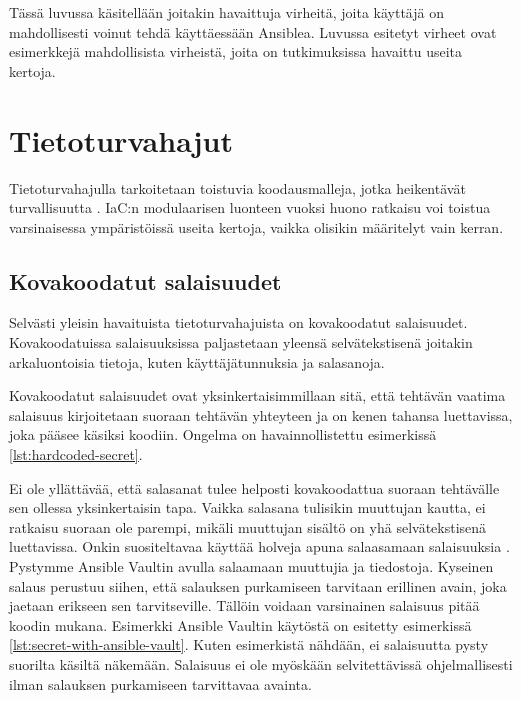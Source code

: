 Tässä luvussa käsitellään joitakin havaittuja virheitä, joita käyttäjä on mahdollisesti
voinut tehdä käyttäessään Ansiblea. Luvussa esitetyt virheet ovat esimerkkejä
mahdollisista virheistä, joita on tutkimuksissa \parencite{RahmanAkond2021SSiA,
    RahmanAkond2019TSSS, KumaraIndika2021Tdad} havaittu useita kertoja.

\section{Tietoturvahajut}

Tietoturvahajulla tarkoitetaan toistuvia koodausmalleja, jotka heikentävät turvallisuutta
\parencite{RahmanAkond2021SSiA}. IaC:n modulaarisen luonteen vuoksi huono ratkaisu voi
toistua varsinaisessa ympäristöissä useita kertoja, vaikka olisikin määritelyt vain
kerran.

\subsection{Kovakoodatut salaisuudet}

Selvästi yleisin havaituista tietoturvahajuista on kovakoodatut salaisuudet. Kovakoodatuissa
salaisuuksissa paljastetaan yleensä selvätekstisenä joitakin arkaluontoisia tietoja, kuten
käyttäjätunnuksia ja salasanoja. \parencite{RahmanAkond2019TSSS}

Kovakoodatut salaisuudet ovat yksinkertaisimmillaan sitä, että tehtävän vaatima salaisuus
kirjoitetaan suoraan tehtävän yhteyteen ja on kenen tahansa luettavissa, joka pääsee käsiksi
koodiin. Ongelma on havainnollistettu esimerkissä \ref{lst:hardcoded-secret}.



Ei ole yllättävää, että salasanat tulee helposti kovakoodattua suoraan tehtävälle sen ollessa
yksinkertaisin tapa. Vaikka salasana tulisikin muuttujan kautta, ei ratkaisu suoraan ole
parempi, mikäli muuttujan sisältö on yhä selvätekstisenä luettavissa. Onkin suositeltavaa
käyttää holveja apuna salaasamaan salaisuuksia \parencite{RahmanAkond2019TSSS}. Pystymme
Ansible Vaultin avulla salaamaan muuttujia ja tiedostoja. Kyseinen salaus perustuu siihen,
että salauksen purkamiseen tarvitaan erillinen avain, joka jaetaan erikseen sen tarvitseville.
Tällöin voidaan varsinainen salaisuus pitää koodin mukana. Esimerkki Ansible Vaultin käytöstä
on esitetty esimerkissä \ref{lst:secret-with-ansible-vault}. Kuten esimerkistä nähdään,
ei salaisuutta pysty suorilta käsiltä näkemään. Salaisuus ei ole myöskään selvitettävissä
ohjelmallisesti ilman salauksen purkamiseen tarvittavaa avainta.

